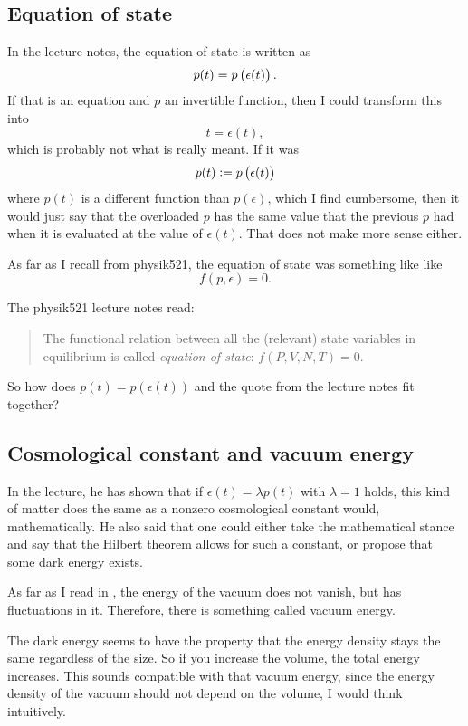 \subsection*{Equation of state}

In the lecture notes, the equation of state is written as
\[
    p(t) = p\del{\epsilon(t)}.
\]
If that is an equation and $p$ an invertible function, then I could transform
this into
\[
    t = \epsilon(t),
\]
which is probably not what is really meant. If it was
\[
    p(t) := p\del{\epsilon(t)}
\]
where $p(t)$ is a different function than $p(\epsilon)$, which I find
cumbersome, then it would just say that the overloaded $p$ has the same value
that the previous $p$ had when it is evaluated at the value of $\epsilon(t)$.
That does not make more sense either.

As far as I recall from physik521, the equation of state was something like
like
\[
    f(p, \epsilon) = 0.
\]

The physik521 lecture notes read:
\begin{quote}
    The functional relation between all the (relevant) state variables in
    equilibrium is called \emph{equation of state}: $f(P, V, N, T) = 0$.
\end{quote}

So how does $p(t) = p(\epsilon(t))$ and the quote from the lecture notes fit
together?

\newpage
\subsection*{Cosmological constant and vacuum energy}

In the lecture, he has shown that if $\epsilon(t) = \lambda p(t)$ with $\lambda
= 1$ holds, this kind of matter does the same as a nonzero cosmological
constant would, mathematically. He also said that one could either take the
mathematical stance and say that the Hilbert theorem allows for such a
constant, or propose that some dark energy exists.

As far as I read in \parencite{penrose-road_to_reality}, the energy of the
vacuum does not vanish, but has fluctuations in it. Therefore, there is
something called vacuum energy.

The dark energy seems to have the property that the energy density stays the
same regardless of the size. So if you increase the volume, the total energy
increases. This sounds compatible with that vacuum energy, since the energy
density of the vacuum should not depend on the volume, I would think
intuitively.

